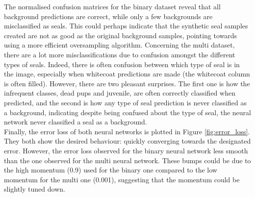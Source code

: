 \documentclass[letterpaper,12pt]{article}
\begin{document}
The normalised confusion matrices for the binary dataset reveal that all background predictions are correct, while only a few backgrounds are misclassified as seals. This could perhaps indicate that the synthetic seal samples created are not as good as the original background samples, pointing towards using a more efficient oversampling algorithm. Concerning the multi dataset, there are a lot more misclassifications due to confusion amongst the different types of seals. Indeed, there is often confusion between which type of seal is in the image, especially when whitecoat predictions are made (the whitecoat column is often filled). However, there are two pleasant surprises. The first one is how the infrequent classes, dead pups and juvenile, are often correctly classified when predicted, and the second is how any type of seal prediction is never classified as a background, indicating despite being confused about the type of seal, the neural network never classified a seal as a background.\\

Finally, the error loss  of both neural networks is plotted in Figure \ref{fig:error_loss}. They both show the desired behaviour: quickly converging towards the designated error. However, the error loss observed for the binary neural network less smooth than the one observed for the multi neural network. These bumps could be due to the high momentum (0.9) used for the binary one compared to the low momentum for the multi one (0.001), suggesting that the momentum could be slightly tuned down.
\end{document}
